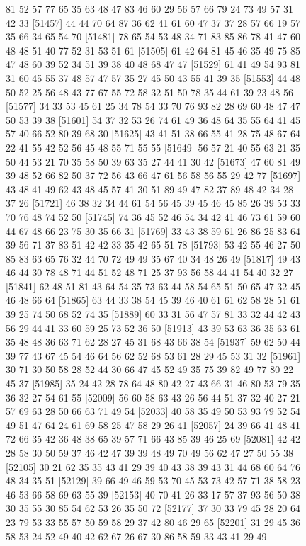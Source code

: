 \documentclass{article}
\begin{document}
\begin{figure}[H]
\begin{Schunk}
\begin{Soutput}
[51433] 81 52 57 77 65 35 63 48 47 83 46 60 29 56 57 66 79 24 73 49 57 31 42 33
[51457] 44 44 70 64 87 36 62 41 61 60 47 37 37 28 57 66 19 57 35 66 34 65 54 70
[51481] 78 65 54 53 48 34 71 83 85 86 78 41 47 60 48 48 51 40 77 52 31 53 51 61
[51505] 61 42 64 81 45 46 35 49 75 85 47 48 60 39 52 34 51 39 38 40 48 68 47 47
[51529] 61 41 49 54 93 81 31 60 45 55 37 48 57 47 57 35 27 45 50 43 55 41 39 35
[51553] 44 48 50 52 25 56 48 43 77 67 55 72 58 32 51 50 78 35 44 61 39 23 48 56
[51577] 34 33 53 45 61 25 34 78 54 33 70 76 93 82 28 69 60 48 47 47 50 53 39 38
[51601] 54 37 32 53 26 74 61 49 36 48 64 35 55 64 41 45 57 40 66 52 80 39 68 30
[51625] 43 41 51 38 66 55 41 28 75 48 67 64 22 41 55 42 52 56 45 48 55 71 55 55
[51649] 56 57 21 40 55 63 21 35 50 44 53 21 70 35 58 50 39 63 35 27 44 41 30 42
[51673] 47 60 81 49 39 48 52 66 82 50 37 72 56 43 66 47 61 56 58 56 55 29 42 77
[51697] 43 48 41 49 62 43 48 45 57 41 30 51 89 49 47 82 37 89 48 42 34 28 37 26
[51721] 46 38 32 34 44 61 54 56 45 39 45 46 45 85 26 39 53 33 70 76 48 74 52 50
[51745] 74 36 45 52 46 54 34 42 41 46 73 61 59 60 44 67 48 66 23 75 30 35 66 31
[51769] 33 43 38 59 61 26 86 25 83 64 39 56 71 37 83 51 42 42 33 35 42 65 51 78
[51793] 53 42 55 46 27 50 85 83 63 65 76 32 44 70 72 49 49 35 67 40 34 48 26 49
[51817] 49 43 46 44 30 78 48 71 44 51 52 48 71 25 37 93 56 58 44 41 54 40 32 27
[51841] 62 48 51 81 43 64 54 35 73 63 44 58 54 65 51 50 65 47 32 45 46 48 66 64
[51865] 63 44 33 38 54 45 39 46 40 61 61 62 58 28 51 61 39 25 74 50 68 52 74 35
[51889] 60 33 31 56 47 57 81 33 32 44 42 43 56 29 44 41 33 60 59 25 73 52 36 50
[51913] 43 39 53 63 36 35 63 61 35 48 48 36 63 71 62 28 27 45 31 68 43 66 38 54
[51937] 59 62 50 44 39 77 43 67 45 54 46 64 56 62 52 68 53 61 28 29 45 53 31 32
[51961] 30 71 30 50 58 28 52 44 30 66 47 45 52 49 35 75 39 82 49 77 80 22 45 37
[51985] 35 24 42 28 78 64 48 80 42 27 43 66 31 46 80 53 79 35 36 32 27 54 61 55
[52009] 56 60 58 63 43 26 56 44 51 37 32 40 27 21 57 69 63 28 50 66 63 71 49 54
[52033] 40 58 35 49 50 53 93 79 52 54 49 51 47 64 24 61 69 58 25 47 58 29 26 41
[52057] 24 39 66 41 48 41 72 66 35 42 36 48 38 65 39 57 71 66 43 85 39 46 25 69
[52081] 42 42 28 58 30 50 59 37 46 42 47 39 39 48 49 70 49 56 62 47 27 50 55 38
[52105] 30 21 62 35 35 43 41 29 39 40 43 38 39 43 31 44 68 60 64 76 48 34 35 51
[52129] 39 66 49 46 59 53 70 45 53 73 42 57 71 38 58 23 46 53 66 58 69 63 55 39
[52153] 40 70 41 26 33 17 57 37 93 56 50 38 30 35 55 30 85 54 62 53 26 35 50 72
[52177] 37 30 33 79 45 28 20 64 23 79 53 33 55 57 50 59 58 29 37 42 80 46 29 65
[52201] 31 29 45 36 58 53 24 52 49 40 42 62 67 26 67 30 86 58 59 33 43 41 29 49

\end{Soutput}
\end{Schunk}
\end{figure}
\end{document}

